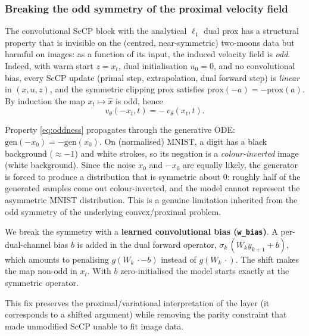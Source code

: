 \documentclass[a4paper,11pt]{article}
\theoremstyle{plain}{\theorembodyfont{\rmfamily}%
\newtheorem{proposition}[theorem]{Proposition}}
\theoremstyle{plain}{\theorembodyfont{\rmfamily}%
\newtheorem{notation}[theorem]{Notation}}
\theoremstyle{plain}{\theorembodyfont{\rmfamily}%
\newtheorem{assumption}[theorem]{Assumption}}
\theoremstyle{plain}{\theorembodyfont{\rmfamily}%
\newtheorem{problem}[theorem]{Problem}}
\theoremstyle{plain}{\theorembodyfont{\rmfamily}%
\newtheorem{example}[theorem]{Example}}
\theoremstyle{plain}{\theorembodyfont{\rmfamily}%
\newtheorem{remark}[theorem]{Remark}}
\theoremstyle{plain}{\theorembodyfont{\rmfamily}%
\newtheorem{definition}[theorem]{Definition}}
\theoremstyle{plain}{\theorembodyfont{\rmfamily}%
\newtheorem{question}[theorem]{Question}}
\numberwithin{equation}{section}
\begin{document}

\subsubsection{Breaking the odd symmetry of the proximal velocity field}
\label{subsubsec:oddsym}

The convolutional ScCP block with the analytical $\ell_1$ dual prox has a
structural property that is invisible on the (centred, near-symmetric) two-moons
data but harmful on images: as a function of its input, the induced velocity
field is \emph{odd}. Indeed, with warm start $z = x_t$, dual initialisation
$u_0 = 0$, and no convolutional bias, every ScCP update
(primal step, extrapolation, dual forward step) is \emph{linear} in $(x,u,z)$,
and the symmetric clipping prox satisfies $\mathrm{prox}(-a) = -\mathrm{prox}(a)$.
By induction the map $x_t \mapsto \hat{x}$ is odd, hence
\begin{equation}
    v_\theta(-x_t, t) = -\,v_\theta(x_t, t) .
    \label{eq:oddness}
\end{equation}

Property \eqref{eq:oddness} propagates through the generative ODE:
$\mathrm{gen}(-x_0) = -\mathrm{gen}(x_0)$. On (normalised) MNIST, a digit has a black
background ($\approx -1$) and white strokes, so its negation is a
\emph{colour-inverted} image (white background). Since the noise $x_0$ and $-x_0$
are equally likely, the generator is forced to produce a distribution that is
symmetric about $0$: roughly half of the generated samples come out
colour-inverted, and the model cannot represent the asymmetric MNIST
distribution. This is a genuine limitation inherited from the odd symmetry of the
underlying convex/proximal problem.

We break the symmetry with a \textbf{learned convolutional bias (\texttt{w\_bias})}.
A per-dual-channel bias $b$ is added in the dual forward operator,
$\sigma_k\,(W_k y_{k+1} + b)$, which amounts to penalising $g(W_k\,\cdot - b)$
instead of $g(W_k\,\cdot)$. The shift makes the map non-odd in $x_t$. With $b$
zero-initialised the model starts exactly at the symmetric operator.

This fix preserves the proximal/variational interpretation of the layer (it
corresponds to a shifted argument) while removing the parity constraint that made
unmodified ScCP unable to fit image data.
\end{document}
